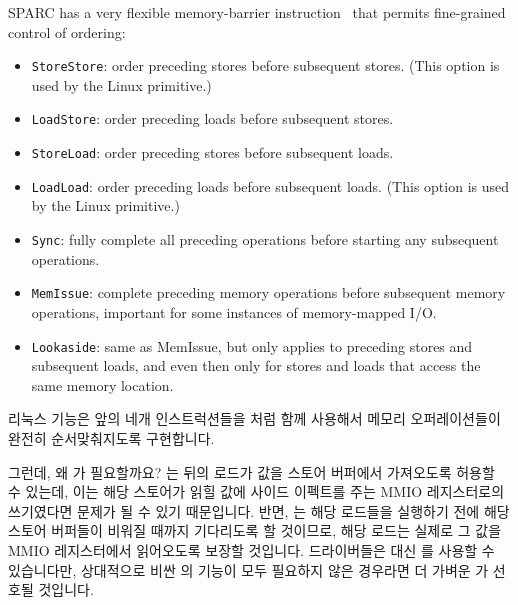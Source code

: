 SPARC has a very flexible memory-barrier instruction~\cite{SPARC94}
that permits fine-grained control of ordering:
\begin{itemize}
\item	{\tt StoreStore}: order preceding stores before subsequent stores.
	(This option is used by the Linux  primitive.)
\item	{\tt LoadStore}: order preceding loads before subsequent stores.
\item	{\tt StoreLoad}: order preceding stores before subsequent loads.
\item	{\tt LoadLoad}: order preceding loads before subsequent loads.
	(This option is used by the Linux  primitive.)
\item	{\tt Sync}: fully complete all preceding operations before starting
	any subsequent operations.
\item	{\tt MemIssue}: complete preceding memory operations before subsequent
	memory operations, important for some instances of memory-mapped
	I/O.
\item	{\tt Lookaside}: same as MemIssue, but only applies to preceding stores
	and subsequent loads, and even then only for stores and loads that
	access the same memory location.
\end{itemize}
\fi

리눅스  기능은 앞의 네개 인스트럭션들을
 처럼
함께 사용해서 메모리 오퍼레이션들이 완전히 순서맞춰지도록 구현합니다.

그런데, 왜  가 필요할까요?
 는 뒤의 로드가 값을 스토어 버퍼에서 가져오도록 허용할
수 있는데, 이는 해당 스토어가 읽힐 값에 사이드 이펙트를 주는 MMIO 레지스터로의
쓰기였다면 문제가 될 수 있기 때문입니다.
반면,  는 해당 로드들을 실행하기 전에 해당 스토어
버퍼들이 비워질 때까지 기다리도록 할 것이므로, 해당 로드는 실제로 그 값을 MMIO
레지스터에서 읽어오도록 보장할 것입니다.
드라이버들은 대신  를 사용할 수 있습니다만, 상대적으로 비싼
 의 기능이 모두 필요하지 않은 경우라면 더 가벼운
 가 선호될 것입니다.

